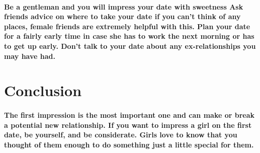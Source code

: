 \documentclass[11pt]{report}
\begin{document}
\paragraph{Be a gentleman and you will impress your date with sweetness
	Ask friends advice on where to take your date if you can’t think of  any places, female friends are extremely helpful with this.
	Plan your date for a fairly early time in case she has to work the next morning or has to get up early.
	Don’t talk to your date about any ex-relationships you may have had.
}
\section{Conclusion}
\paragraph{The first impression is the most important one and can make or break a potential new relationship. If you want to impress a girl on the first date, be yourself, and be considerate. Girls love to know that you thought of them enough to do something just a little special for them.}
\end{document}

